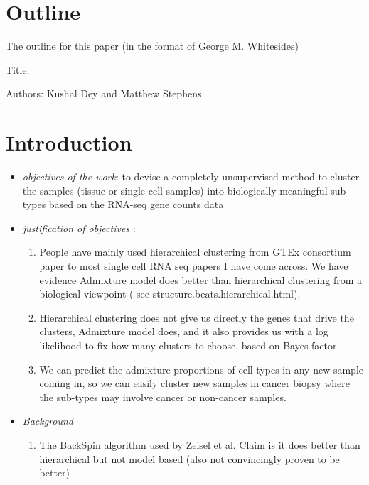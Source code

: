 \section{Outline}

The outline for this paper (in the format of George M. Whitesides)

Title: 

Authors: Kushal Dey and Matthew Stephens

\section{Introduction}

\begin{itemize}

\item \textit{objectives of the work}: to devise a completely unsupervised method to cluster the samples (tissue or single cell samples) into biologically meaningful sub-types based on the RNA-seq gene counts data

\item \textit{justification of objectives} : 
\begin{enumerate}

\item  People have mainly used hierarchical clustering from GTEx consortium paper to most single cell RNA seq papers I have come across. We have evidence Admixture model does better than hierarchical clustering from  a biological viewpoint ( see structure.beats.hierarchical.html).

\item Hierarchical clustering does not give us directly the genes that drive the clusters, Admixture model does, and it also provides us with a log likelihood to fix how many clusters to choose, based on Bayes factor. 

\item We can predict the admixture proportions of cell types in any new sample coming in, so we can easily cluster new samples in cancer biopsy where the sub-types may involve cancer or non-cancer samples.

 

\end{enumerate}

\item \textit{Background}
\begin{enumerate}
\item The BackSpin algorithm used by Zeisel et al. Claim is it does better than hierarchical but not model based (also not convincingly proven to be better)


\end{enumerate}
\end{itemize}
